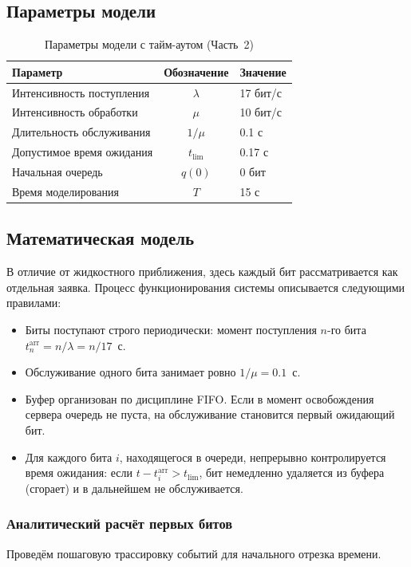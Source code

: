 \documentclass[a4paper,12pt]{article}
\begin{document}
\subsection*{Параметры модели}
\begin{table}[h!]
    \centering
    \caption{Параметры модели с тайм-аутом (Часть~2)}
    \label{tab:params2}
    \begin{tabular}{|l|c|l|}
        \hline
        Параметр & Обозначение & Значение \\
        \hline
        Интенсивность поступления & $\lambda$ & 17 бит/с \\
        Интенсивность обработки   & $\mu$    & 10 бит/с \\
        Длительность обслуживания & $1/\mu$  & 0.1 с \\
        Допустимое время ожидания  & $t_{\text{lim}}$ & 0.17 с \\
        Начальная очередь         & $q(0)$  & 0 бит \\
        Время моделирования       & $T$     & 15 с \\
        \hline
    \end{tabular}
\end{table}

\subsection*{Математическая модель}
В отличие от жидкостного приближения, здесь каждый бит рассматривается как отдельная
заявка. Процесс функционирования системы описывается следующими правилами:
\begin{itemize}
    \item Биты поступают строго периодически: момент поступления $n$-го бита
          $t_n^{\text{arr}} = n / \lambda = n/17$~с.
    \item Обслуживание одного бита занимает ровно $1/\mu = 0.1$~с.
    \item Буфер организован по дисциплине FIFO. Если в момент освобождения сервера
          очередь не пуста, на обслуживание становится первый ожидающий бит.
    \item Для каждого бита $i$, находящегося в очереди, непрерывно контролируется
          время ожидания: если $t - t_i^{\text{arr}} > t_{\text{lim}}$, бит
          немедленно удаляется из буфера (сгорает) и в дальнейшем не обслуживается.
\end{itemize}

\subsubsection*{Аналитический расчёт первых битов}
Проведём пошаговую трассировку событий для начального отрезка времени.
\end{document}
